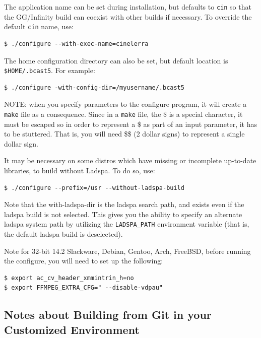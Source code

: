 The application name can be set during installation, but defaults to \texttt{cin} so that the GG/Infinity build can coexist with other \CGG{} builds if necessary.  To override the default \texttt{cin} name, use:	
\begin{lstlisting}[numbers=none]
$ ./configure --with-exec-name=cinelerra
\end{lstlisting}

The home configuration directory can also be set, but default location is \texttt{\$HOME/.bcast5}.  
For example:

\begin{lstlisting}[numbers=none]
$ ./configure -with-config-dir=/myusername/.bcast5
\end{lstlisting}

NOTE:  when you specify parameters to the configure program, it will create a \texttt{make} file as a consequence.  
Since in a \texttt{make} file, the \$ is a special character, it must be escaped so in order to represent a \$ as part of an input parameter, it has to be stuttered.  
That is, you will need \$\$ (2 dollar signs) to represent a single dollar sign. 

It may be necessary on some distros which have missing or incomplete up-to-date libraries, to build \CGG{} without Ladspa.  
To do so, use:

\begin{lstlisting}[numbers=none]
$ ./configure --prefix=/usr --without-ladspa-build
\end{lstlisting}

Note that the with-ladspa-dir is the ladspa search path, and exists even if the ladspa build is not selected.  This gives you the ability to specify an alternate ladspa system path by utilizing the \texttt{LADSPA\_PATH} environment variable (that is, the default ladspa build is deselected).

Note for 32-bit 14.2 Slackware, Debian, Gentoo, Arch, FreeBSD, before running the configure, you will need to set up the following:

\begin{lstlisting}[numbers=none]
$ export ac_cv_header_xmmintrin_h=no
$ export FFMPEG_EXTRA_CFG=" --disable-vdpau"
\end{lstlisting}

\subsection{Notes about Building from Git in your Customized Environment}%
\label{sub:notes_about_building_from_git_in_your_customized_environment}

